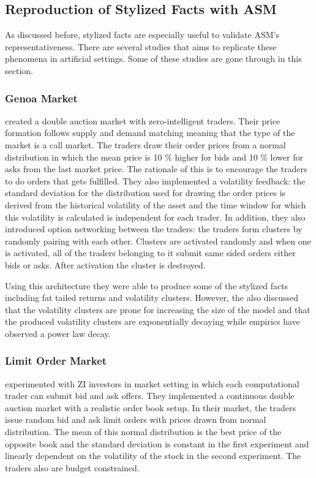 
\subsection{Reproduction of Stylized Facts with ASM}
As discussed before, stylized facts are especially useful
to validate ASM's representativeness. There are several 
studies that aims to replicate these phenomena in 
artificial settings. Some of these studies are
gone through in this section.
% 
\subsubsection{Genoa Market}

\citet{Genoa01} created a double auction market with zero-intelligent 
traders. Their price formation follows supply and demand matching meaning 
that the type of the market is a call market. The traders draw their 
order prices from a normal distribution in which the mean price is 10 \%
higher for bids and 10 \% lower for asks from the last market price. The
rationale of this is to encourage the traders to do orders that gets fulfilled.
They also implemented a volatility feedback: the standard deviation for 
the distribution used for drawing the order prices is derived from the 
historical volatility of the asset and the time window for which this
volatility is calculated is independent for each trader. In addition,
they also introduced option networking between the traders: the traders
form clusters by randomly pairing with each other. Clusters are activated
randomly and when one is activated, all of the traders belonging to it
submit same sided orders either bids or asks. After activation the cluster is destroyed.

Using this architecture they were able to produce some of the stylized facts
including fat tailed returns and volatility clusters. However, the also discussed
that the volatility clusters are prone for increasing the size of the model and
that the produced volatility clusters are exponentially decaying while empirics have
observed a power law decay.

\subsubsection{Limit Order Market}
\citet{Raberto05} experimented with ZI investors in market setting
in which each computational trader can submit bid and ask offers. They
implemented a continuous double auction market with a realistic order
book setup. In their market, the traders issue random bid and ask limit
orders with prices drawn from normal distribution. The mean of this 
normal distribution is the best price of the opposite book and the 
standard deviation is constant in the first experiment and linearly 
dependent on the volatility of the stock in the second experiment. The
traders also are budget constrained. 

